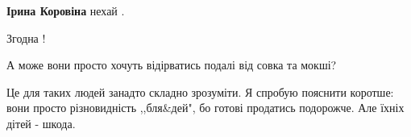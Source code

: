 \begin{itemize}
\begin{itemize}
 
\textbf{Ірина Коровіна} нехай .
\end{itemize}

 
Згодна !

 
А може вони просто хочуть відірватись подалі від совка та мокші?

 

Це для таких людей занадто складно зрозуміти. Я спробую пояснити коротше: вони
просто різновидність ,,бля\&дей", бо готові продатись подорожче. Але їхніх дітей
- шкода.
\end{itemize}

